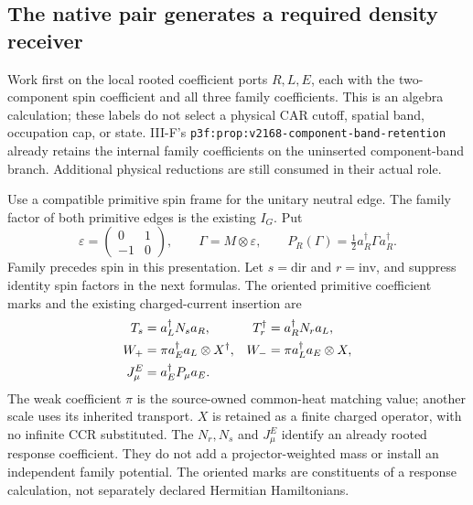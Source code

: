 \documentclass[12pt,a4paper]{article}
\begin{document}
\subsection{The native pair generates a required density receiver}
Work first on the local rooted coefficient ports $R,L,E$, each with the
two-component spin coefficient and all three family coefficients. This is
an algebra calculation; these labels do not select a physical CAR cutoff,
spatial band, occupation cap, or state. III-F's
\texttt{p3f:prop:v2168-component-band-retention} already retains the internal
family coefficients on the uninserted component-band branch. Additional
physical reductions are still consumed in their actual role.

Use a compatible primitive spin frame for the unitary neutral edge. The
family factor of both primitive edges is the existing $I_G$. Put
\[
 \varepsilon=\begin{pmatrix}0&1\\-1&0\end{pmatrix},\qquad
 \Gamma=M\otimes\varepsilon,\qquad
 P_R(\Gamma)=\tfrac12 a_R^\dagger\Gamma a_R^\dagger.
\]
Family precedes spin in this presentation. Let $s=\mathrm{dir}$ and
$r=\mathrm{inv}$, and suppress identity spin factors in the next formulas.
The oriented primitive coefficient marks and the existing charged-current
insertion are
\begin{align}
 T_s&=a_L^\dagger N_s a_R,&
 T_r^\dagger&=a_R^\dagger N_r a_L,\notag\\
 W_+&=\pi a_E^\dagger a_L\otimes X^\dagger,&
 W_-&=\pi a_L^\dagger a_E\otimes X,\notag\\
 J_\mu^E&=a_E^\dagger P_\mu a_E.&&
 \label{p5c:v2171:eq:receiververtices}
\end{align}
The weak coefficient $\pi$ is the source-owned common-heat matching value;
another scale uses its inherited transport. $X$ is retained as a finite
charged operator, with no infinite CCR substituted. The $N_r,N_s$ and
$J_\mu^E$ identify an already rooted response coefficient. They do not add
a projector-weighted mass or install an independent family potential.
The oriented marks are constituents of a response calculation, not separately
declared Hermitian Hamiltonians.
\end{document}
